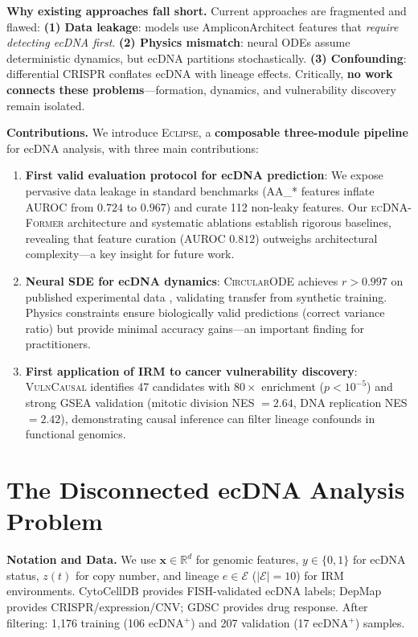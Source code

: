 \documentclass{article}
\newcommand{\eclipse}{\textsc{Eclipse}}
\newcommand{\former}{\textsc{ecDNA-Former}}
\newcommand{\circularode}{\textsc{CircularODE}}
\newcommand{\vulncausal}{\textsc{VulnCausal}}
\begin{document}
\textbf{Why existing approaches fall short.} Current approaches are fragmented and flawed: \textbf{(1) Data leakage}: models use AmpliconArchitect features that \textit{require detecting ecDNA first}. \textbf{(2) Physics mismatch}: neural ODEs assume deterministic dynamics, but ecDNA partitions stochastically. \textbf{(3) Confounding}: differential CRISPR conflates ecDNA with lineage effects. Critically, \textbf{no work connects these problems}---formation, dynamics, and vulnerability discovery remain isolated.

\textbf{Contributions.} We introduce \eclipse{}, a \textbf{composable three-module pipeline} for ecDNA analysis, with three main contributions:
\begin{enumerate}[nosep,topsep=2pt,leftmargin=*]
\item \textbf{First valid evaluation protocol for ecDNA prediction}: We expose pervasive data leakage in standard benchmarks (AA\_* features inflate AUROC from $0.724$ to $0.967$) and curate 112 non-leaky features. Our \former{} architecture and systematic ablations establish rigorous baselines, revealing that feature curation (AUROC $0.812$) outweighs architectural complexity---a key insight for future work.
\item \textbf{Neural SDE for ecDNA dynamics}: \circularode{} achieves $r > 0.997$ on published experimental data \citep{lange_2022_mathematical}, validating transfer from synthetic training. Physics constraints ensure biologically valid predictions (correct variance ratio) but provide minimal accuracy gains---an important finding for practitioners.
\item \textbf{First application of IRM to cancer vulnerability discovery}: \vulncausal{} identifies 47 candidates with $80\times$ enrichment ($p < 10^{-5}$) and strong GSEA validation (mitotic division NES $= 2.64$, DNA replication NES $= 2.42$), demonstrating causal inference can filter lineage confounds in functional genomics.
\end{enumerate}


\section{The Disconnected ecDNA Analysis Problem}
\label{sec:limitations}

\textbf{Notation and Data.} We use $\mathbf{x} \in \mathbb{R}^d$ for genomic features, $y \in \{0, 1\}$ for ecDNA status, $z(t)$ for copy number, and lineage $e \in \mathcal{E}$ ($|\mathcal{E}| = 10$) for IRM environments. CytoCellDB \citep{cytocelldb_2024} provides FISH-validated ecDNA labels; DepMap \citep{depmap_2023} provides CRISPR/expression/CNV; GDSC \citep{gdsc_2013} provides drug response. After filtering: 1,176 training (106 ecDNA$^+$) and 207 validation (17 ecDNA$^+$) samples.
\end{document}
